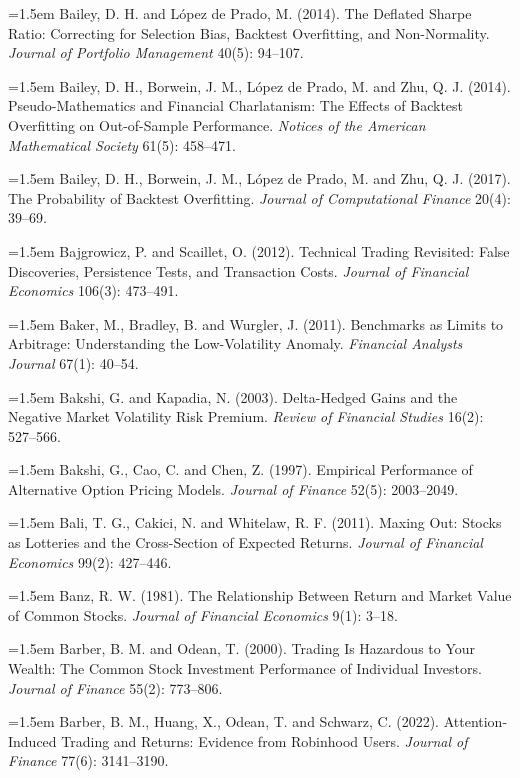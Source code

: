 \hangindent=1.5em Bailey, D. H. and L\'opez de Prado, M. (2014). The Deflated Sharpe Ratio: Correcting for Selection Bias, Backtest Overfitting, and Non-Normality. \emph{Journal of Portfolio Management} 40(5): 94--107.

\hangindent=1.5em Bailey, D. H., Borwein, J. M., L\'opez de Prado, M. and Zhu, Q. J. (2014). Pseudo-Mathematics and Financial Charlatanism: The Effects of Backtest Overfitting on Out-of-Sample Performance. \emph{Notices of the American Mathematical Society} 61(5): 458--471.

\hangindent=1.5em Bailey, D. H., Borwein, J. M., L\'opez de Prado, M. and Zhu, Q. J. (2017). The Probability of Backtest Overfitting. \emph{Journal of Computational Finance} 20(4): 39--69.

\hangindent=1.5em Bajgrowicz, P. and Scaillet, O. (2012). Technical Trading Revisited: False Discoveries, Persistence Tests, and Transaction Costs. \emph{Journal of Financial Economics} 106(3): 473--491.

\hangindent=1.5em Baker, M., Bradley, B. and Wurgler, J. (2011). Benchmarks as Limits to Arbitrage: Understanding the Low-Volatility Anomaly. \emph{Financial Analysts Journal} 67(1): 40--54.

\hangindent=1.5em Bakshi, G. and Kapadia, N. (2003). Delta-Hedged Gains and the Negative Market Volatility Risk Premium. \emph{Review of Financial Studies} 16(2): 527--566.

\hangindent=1.5em Bakshi, G., Cao, C. and Chen, Z. (1997). Empirical Performance of Alternative Option Pricing Models. \emph{Journal of Finance} 52(5): 2003--2049.

\hangindent=1.5em Bali, T. G., Cakici, N. and Whitelaw, R. F. (2011). Maxing Out: Stocks as Lotteries and the Cross-Section of Expected Returns. \emph{Journal of Financial Economics} 99(2): 427--446.

\hangindent=1.5em Banz, R. W. (1981). The Relationship Between Return and Market Value of Common Stocks. \emph{Journal of Financial Economics} 9(1): 3--18.

\hangindent=1.5em Barber, B. M. and Odean, T. (2000). Trading Is Hazardous to Your Wealth: The Common Stock Investment Performance of Individual Investors. \emph{Journal of Finance} 55(2): 773--806.

\hangindent=1.5em Barber, B. M., Huang, X., Odean, T. and Schwarz, C. (2022). Attention-Induced Trading and Returns: Evidence from Robinhood Users. \emph{Journal of Finance} 77(6): 3141--3190.


